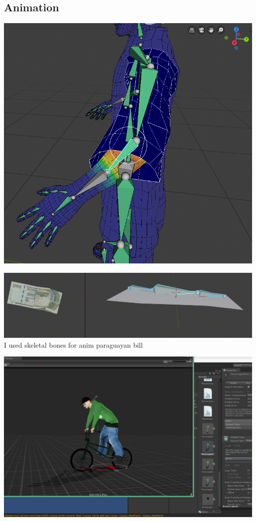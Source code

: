 \documentclass{article}
\begin{document}
  \subsection{Animation}
  \includegraphics[width=\textwidth]{30.png}
  
  \includegraphics[width=\textwidth]{31.png}
  I used skeletal bones for anim paraguayan bill

  \includegraphics[width=\textwidth]{28.png}
\end{document}
